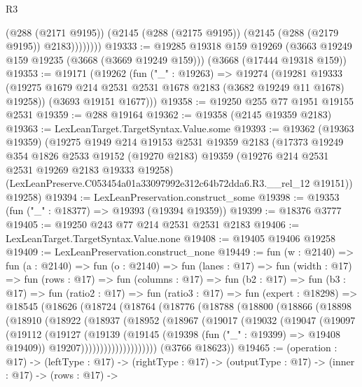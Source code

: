 \begin{lexlean}{R3}
\begin{coremodule}
                (@288 (@2171 @9195))
                (@2145 (@288 (@2175 @9195)) (@2145 (@288 (@2179 @9195)) @2183))))))))
@19333 := @19285
    @19318
    @159
    @19269
    (@3663 @19249 @159 @19235 (@3668 (@3669 @19249 @159)))
    (@3668 (@17444 @19318 @159))
@19353 := @19171
    (@19262
      (fun ("_" : @19263) =>
      @19274
        (@19281 @19333 (@19275 @1679 @214 @2531 @2531 @1678 @2183 (@3682 @19249 @11 @1678) @19258))
        (@3693 @19151 @1677)))
@19358 := @19250 @255 @77 @1951 @19155 @2531
@19359 := @288 @19164
@19362 := @19358 (@2145 @19359 @2183)
@19363 := LexLeanTarget.TargetSyntax.Value.some
@19393 := @19362
    (@19363 @19359)
    (@19275
      @1949
      @214
      @19153
      @2531
      @19359
      @2183
      (@17373
        @19249
        @354
        @1826
        @2533
        @19152
        (@19270 @2183)
        @19359
        (@19276 @214 @2531 @2531 @19269 @2183 @19333 @19258)
        (LexLeanPreserve.C053454a01a33097992e312c64b72dda6.R3.__rel_12 @19151))
      @19258)
@19394 := LexLeanPreservation.construct_some
@19398 := @19353 (fun ("_" : @18377) => @19393 (@19394 @19359))
@19399 := @18376 @3777
@19405 := @19250 @243 @77 @214 @2531 @2531 @2183
@19406 := LexLeanTarget.TargetSyntax.Value.none
@19408 := @19405 @19406 @19258
@19409 := LexLeanPreservation.construct_none
@19449 := fun (w : @2140) =>
  fun (a : @2140) =>
  fun (o : @2140) =>
  fun (lanes : @17) =>
  fun (width : @17) =>
  fun (rows : @17) =>
  fun (columns : @17) =>
  fun (b2 : @17) =>
  fun (b3 : @17) =>
  fun (ratio2 : @17) =>
  fun (ratio3 : @17) =>
  fun (expert : @18298) =>
  @18545
    (@18626
      (@18724
        (@18764
          (@18776
            (@18788
              (@18800
                (@18866
                  (@18898
                    (@18910
                      (@18922
                        (@18937
                          (@18952
                            (@18967
                              (@19017
                                (@19032
                                  (@19047
                                    (@19097
                                      (@19112
                                        (@19127
                                          (@19139
                                            (@19145
                                              (@19398 (fun ("_" : @19399) => @19408 @19409))
                                              @19207))))))))))))))))))))
      (@3766 @18623))
@19465 := (operation : @17) ->
  (leftType : @17) ->
  (rightType : @17) ->
  (outputType : @17) ->
  (inner : @17) ->
  (rows : @17) ->

\end{coremodule}
\end{lexlean}
